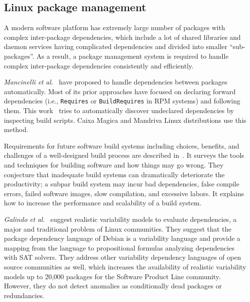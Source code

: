 
\subsection{Linux package management}

A modern software platform has extremely large number of packages with complex inter-package dependencies, which include a lot of shared libraries and daemon services having complicated dependencies and divided into smaller ``sub-packages''.
As a result, a package management system is required to handle complex inter-package dependencies consistently and efficiently.


\textit{Mancinelli et al.}~\cite{11Mancinelli2006ASE} have proposed to handle dependencies between packages automatically.
Most of its prior approaches have focused on declaring forward dependencies (i.e., \texttt{Requires} or \texttt{BuildRequires} in RPM systems) and following them.
This work~\cite{11Mancinelli2006ASE} tries to automatically discover undeclared dependencies by inspecting build scripts.
Caixa Magica and Mandriva Linux distributions use this method.


Requirements for future software build systems including choices, benefits, and challenges of a well-designed build process are described in~\cite{12Smith2011SBSBook}.
It surveys the tools and techniques for building software and how things may go wrong.
They conjecture that inadequate build systems can dramatically deteriorate the productivity; a subpar build system may incur bad dependencies, false compile errors, failed software images, slow compilation, and excessive labors.
It explains how to increase the performance and scalability of a build system. 


\textit{Galindo et al.}~\cite{13Galindo2010DebianPR} suggest realistic variability models to evaluate dependencies, a major and traditional problem of Linux communities.
They suggest that the package dependency language of Debian is a variability language and provide a mapping from the language to propositional formulas analyzing dependencies with SAT solvers.
They address other variability dependency languages of open source communities as well, which increases the availability of realistic variability models up to 20,000 packages for the Software Product Line community.
However, they do not detect anomalies as conditionally dead packages or redundancies.


